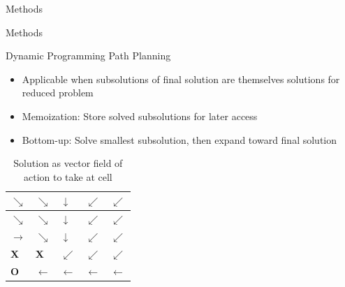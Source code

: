\documentclass[xcolor=table, 9pt]{beamer}
\begin{document}
\begin{section}{Methods}
    \begin{frame}{Methods}
        \begin{block}{Dynamic Programming Path Planning}
            \begin{itemize}
                \item Applicable when subsolutions of final solution are themselves solutions for reduced problem
                \item Memoization: Store solved subsolutions for later access
                \item Bottom-up: Solve smallest subsolution, then expand toward final solution 
            \end{itemize}
            \begin{table}[]
\begin{tabular}{|l|l|l|l|l|}
\hline
$\searrow$ & $\searrow$  & $\downarrow$   & $\swarrow$     & $\swarrow$   \\
\hline
$\searrow$ & $\searrow$  & $\downarrow$   & $\swarrow$     & $\swarrow$   \\
\hline
$\rightarrow$ & $\searrow$  & $\downarrow$   & $\swarrow$     & $\swarrow$   \\
\hline
\textbf{X}           &   \textbf{X}  & $\swarrow$  & $\swarrow$    & $\swarrow$  \\
\hline
\textbf{O}  & $\leftarrow$  & $\leftarrow$ & $\leftarrow$ & $\leftarrow$ \\
\hline
\end{tabular}
\caption{Solution as vector field of action to take at cell}
            \end{table}
            

\end{block}
\end{frame}
\end{section}
\end{document}

